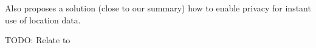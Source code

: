 		Also \parencite{casper} proposes a solution (close to our summary) how to enable privacy for instant use of location data.


TODO: Relate to \parencite{k-anonymity}

